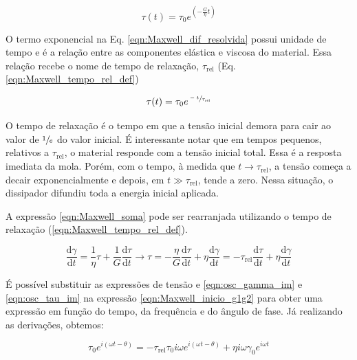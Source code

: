 			\begin{equation}
				\tau(t) = \tau_0 e^{\left( -\frac{G}{\eta}t \right)}
				\label{eqn:Maxwell_dif_resolvida}
			\end{equation}
			
			O termo exponencial na Eq. \ref{eqn:Maxwell_dif_resolvida} possui unidade de tempo e é a relação entre as componentes elástica e viscosa do material. Essa relação recebe o nome de tempo de relaxação, \(\tau_{\mathrm{rel}}\) (Eq. \ref{eqn:Maxwell_tempo_rel_def})
			
			\begin{equation}
				\tau(t) = \tau_0 e^{\sfrac{-t}{\tau_{\textrm{rel}}}}
				\label{eqn:Maxwell_tempo_rel_def}
			\end{equation}
		
			O tempo de relaxação é o tempo em que a tensão inicial demora para cair ao valor de \(\sfrac{1}{e}\) do valor inicial. É interessante notar que em tempos pequenos, relativos a \(\tau_{\mathrm{rel}}\), o material responde com a tensão inicial total. Essa é a resposta imediata da mola. Porém, com o tempo, à medida que \(t\to\tau_{\mathrm{rel}}\), a tensão começa a decair exponencialmente e depois, em \(t \gg \tau_{\mathrm{rel}}\), tende a zero. Nessa situação, o dissipador difundiu toda a energia inicial aplicada.
			
			A expressão \ref{eqn:Maxwell_soma} pode ser rearranjada utilizando o tempo de relaxação (\ref{eqn:Maxwell_tempo_rel_def}).
			
			\begin{equation}
				\dfrac{\mathrm{d}\gamma}{\mathrm{d}t} = \dfrac{1}{\eta}\tau + \dfrac{1}{G}\dfrac{\mathrm{d}\tau}{\mathrm{d}t} \to 
				\tau = -\dfrac{\eta}{G} \dfrac{\mathrm{d}\tau}{\mathrm{d}t} + \eta\dfrac{\mathrm{d}\gamma}{\mathrm{d}t} =
				-\tau_{\textrm{rel}} \dfrac{\mathrm{d}\tau}{\mathrm{d}t} + \eta\dfrac{\mathrm{d}\gamma}{\mathrm{d}t}
				\label{eqn:Maxwell_inicio_g1g2}
			\end{equation}
			
			É possível substituir as expressões de tensão e \ref{eqn:osc_gamma_im} e \ref{eqn:osc_tau_im} na expressão \ref{eqn:Maxwell_inicio_g1g2} para obter uma expressão em função do tempo, da frequência e do ângulo de fase. Já realizando as derivações, obtemos:
			
			\begin{equation}
				\tau_0 e^{i \left( \omega t - \theta \right)} = - \tau_{\textrm{rel}} \tau_0 i\omega e^{i \left( \omega t - \theta \right)}     +       \eta i\omega\gamma_0e^{i\omega t}
				\label{eqn:Maxwell_substituicao}
			\end{equation}
			

